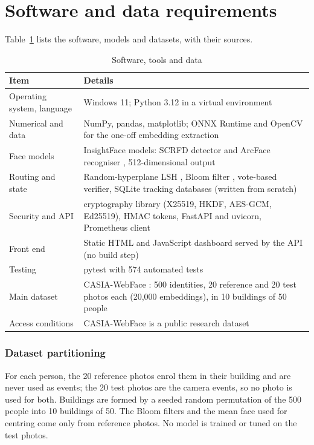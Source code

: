 \documentclass[12pt,a4paper,oneside]{report}
\begin{document}
\section{Software and data requirements}
Table~\ref{tab:software} lists the software, models and datasets, with their sources.

\begin{table}[htbp]
\centering
\caption{Software, tools and data}\label{tab:software}
{\small\setlength{\tabcolsep}{4pt}\renewcommand{\arraystretch}{1.2}
\begin{tabular}{|p{3.59cm}|p{10.99cm}|}\hline
\textbf{Item} & \textbf{Details}\\\hline
Operating system, language & Windows 11; Python 3.12 in a virtual environment\\\hline
Numerical and data & NumPy, pandas, matplotlib; ONNX Runtime and OpenCV for the one-off embedding extraction\\\hline
Face models & InsightFace models: SCRFD detector \cite{ref18} and ArcFace recogniser \cite{ref17}, 512-dimensional output\\\hline
Routing and state & Random-hyperplane LSH \cite{ref14}, Bloom filter \cite{ref12}, vote-based verifier, SQLite tracking databases (written from scratch)\\\hline
Security and API & cryptography library (X25519, HKDF, AES-GCM, Ed25519), HMAC tokens, FastAPI and uvicorn, Prometheus client\\\hline
Front end & Static HTML and JavaScript dashboard served by the API (no build step)\\\hline
Testing & pytest with 574 automated tests\\\hline
Main dataset & CASIA-WebFace \cite{ref19}: 500 identities, 20 reference and 20 test photos each (20,000 embeddings), in 10 buildings of 50 people\\\hline
Access conditions & CASIA-WebFace is a public research dataset\\\hline
\end{tabular}}
\end{table}

\subsubsection{Dataset partitioning}
For each person, the 20 reference photos enrol them in their building and are never used as events; the 20 test photos are the camera events, so no photo is used for both. Buildings are formed by a seeded random permutation of the 500 people into 10 buildings of 50. The Bloom filters and the mean face used for centring come only from reference photos. No model is trained or tuned on the test photos.
\end{document}
